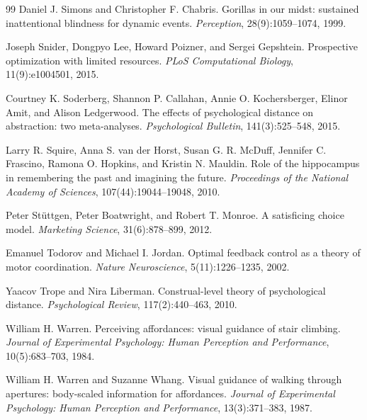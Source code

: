 \documentclass[11pt,a4paper]{article}
\theoremstyle{remark}
\begin{document}
\begin{thebibliography}{99}
Daniel J. Simons and Christopher F. Chabris.
\newblock Gorillas in our midst: sustained inattentional blindness for dynamic events.
\newblock \emph{Perception}, 28(9):1059--1074, 1999.

Joseph Snider, Dongpyo Lee, Howard Poizner, and Sergei Gepshtein.
\newblock Prospective optimization with limited resources.
\newblock \emph{PLoS Computational Biology}, 11(9):e1004501, 2015.

Courtney K. Soderberg, Shannon P. Callahan, Annie O. Kochersberger, Elinor Amit, and Alison Ledgerwood.
\newblock The effects of psychological distance on abstraction: two meta-analyses.
\newblock \emph{Psychological Bulletin}, 141(3):525--548, 2015.

Larry R. Squire, Anna S. van der Horst, Susan G. R. McDuff, Jennifer C. Frascino, Ramona O. Hopkins, and Kristin N. Mauldin.
\newblock Role of the hippocampus in remembering the past and imagining the future.
\newblock \emph{Proceedings of the National Academy of Sciences}, 107(44):19044--19048, 2010.

Peter St\"uttgen, Peter Boatwright, and Robert T. Monroe.
\newblock A satisficing choice model.
\newblock \emph{Marketing Science}, 31(6):878--899, 2012.

Emanuel Todorov and Michael I. Jordan.
\newblock Optimal feedback control as a theory of motor coordination.
\newblock \emph{Nature Neuroscience}, 5(11):1226--1235, 2002.

Yaacov Trope and Nira Liberman.
\newblock Construal-level theory of psychological distance.
\newblock \emph{Psychological Review}, 117(2):440--463, 2010.

William H. Warren.
\newblock Perceiving affordances: visual guidance of stair climbing.
\newblock \emph{Journal of Experimental Psychology: Human Perception and Performance}, 10(5):683--703, 1984.

William H. Warren and Suzanne Whang.
\newblock Visual guidance of walking through apertures: body-scaled information for affordances.
\newblock \emph{Journal of Experimental Psychology: Human Perception and Performance}, 13(3):371--383, 1987.


\end{thebibliography}
\end{document}
